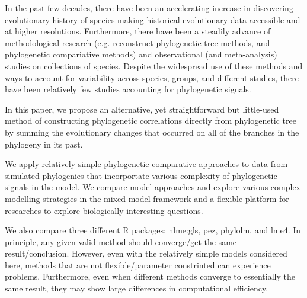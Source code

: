 In the past few decades, there have been an accelerating increase in discovering evolutionary history of species making historical evolutionary data accessible and at higher resolutions.
Furthermore, there have been a steadily advance of methodological research (e.g. reconstruct phylogenetic tree methods, and phylogenetic compariative methods) and observational (and meta-analysis) studies on collections of species. 
Despite the widespread use of these methods and ways to account for variability across species, groups, and different studies, there have been relatively few studies accounting for phylogenetic signals. 




In this paper, we propose an alternative, yet straightforward but little-used method of constructing phylogenetic correlations directly from phylogenetic tree by summing the evolutionary changes that occurred on all of the branches in the phylogeny in its past.

We apply relatively simple phylogenetic comparative approaches to data from simulated phylogenies that incorportate various complexity of phylogenetic signals in the model. 
We compare model approaches and explore various complex modelling strategies in the mixed model framework and a flexible platform for researches to explore biologically interesting questions.

We also compare three different R packages: nlme:gls, pez, phylolm, and lme4.
In principle, any given valid method should converge/get the same result/conclusion.
However, even with the relatively simple models considered here, methods that are not flexible/parameter constrinted can experience problems.
Furthermore, even when different methods converge to essentially the same result, they may show large differences in computational efficiency.

